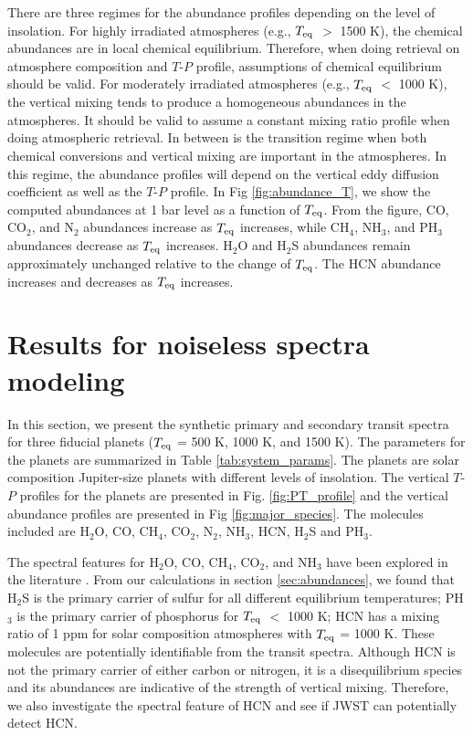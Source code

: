 \documentclass[twocolumn]{aastex61}
\begin{document}
There are three regimes for the abundance profiles depending on the level of insolation. For highly irradiated atmospheres (e.g., $T_{\rm eq}$ $>$ 1500 K), the chemical abundances are in local chemical equilibrium. Therefore, when doing retrieval on atmosphere composition and $T$-$P$ profile, assumptions of chemical equilibrium should be valid. For moderately irradiated atmospheres (e.g., $T_{\rm eq}$ $<$ 1000 K), the vertical mixing tends to produce a homogeneous abundances in the atmospheres. It should be valid to assume a constant mixing ratio profile when doing atmospheric retrieval. In between is the transition regime when both chemical conversions and vertical mixing are important in the atmospheres. In this regime, the abundance profiles will depend on the vertical eddy diffusion coefficient as well as the $T$-$P$ profile. 
In Fig \ref{fig:abundance_T}, we show the computed abundances at 1 bar level as a function of $T_{\rm eq}$. From the figure, CO, CO$_2$, and N$_2$ abundances increase as $T_{\rm eq}$ increases, while CH$_4$, NH$_3$, and PH$_3$ abundances decrease as $T_{\rm eq}$ increases. H$_2$O and H$_2$S abundances remain approximately unchanged relative to the change of $T_{\rm eq}$. The HCN abundance increases and decreases as $T_{\rm eq}$ increases. 

\section{Results for noiseless spectra modeling}\label{sec:noiseless_spectra}

In this section, we present the synthetic primary and secondary transit spectra for three fiducial planets ($T_{\rm eq}$ = 500 K, 1000 K, and 1500 K). The parameters for the planets are summarized in Table \ref{tab:system_params}. The planets are solar composition Jupiter-size planets with different levels of insolation. The vertical $T$-$P$ profiles for the planets are presented in Fig. \ref{fig:PT_profile} and the vertical abundance profiles are presented in Fig \ref{fig:major_species}. The molecules included are H$_2$O, CO, CH$_4$, CO$_2$, N$_2$, NH$_3$, HCN, H$_2$S and PH$_3$.  

The spectral features for H$_2$O, CO, CH$_4$, CO$_2$, and NH$_3$ have been explored in the literature \citep[e.g.][]{Greene16}. From our calculations in section \ref{sec:abundances}, we found that H$_2$S is the primary carrier of sulfur for all different equilibrium temperatures; PH$_3$ is the primary carrier of phosphorus for $T_{\rm eq}$ $<$ 1000 K; HCN has a mixing ratio of 1 ppm for solar composition atmospheres with $T_{\rm eq}$ = 1000 K. These molecules are potentially identifiable from the transit spectra. Although HCN is not the primary carrier of either carbon or nitrogen, it is a disequilibrium species and its abundances are indicative of the strength of vertical mixing. Therefore, we also investigate the spectral feature of HCN and see if JWST can potentially detect HCN. 
\end{document}
